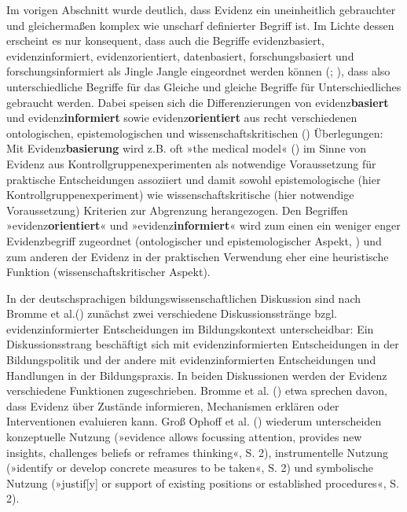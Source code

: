 \documentclass[
  jou,
  floatsintext,
  longtable,
  nolmodern,
  notxfonts,
  notimes,
  colorlinks=true,linkcolor=blue,citecolor=blue,urlcolor=blue]{apa7}
\begin{document}
Im vorigen Abschnitt wurde deutlich, dass Evidenz ein uneinheitlich
gebrauchter und gleichermaßen komplex wie unscharf definierter Begriff
ist. Im Lichte dessen erscheint es nur konsequent, dass auch die
Begriffe evidenzbasiert, evidenzinformiert, evidenzorientiert,
datenbasiert, forschungsbasiert und forschungsinformiert als Jingle
Jangle eingeordnet werden können (; ), dass also
unterschiedliche Begriffe für das Gleiche und gleiche Begriffe für
Unterschiedliches gebraucht werden. Dabei speisen sich die
Differenzierungen von evidenz\textbf{basiert} und
evidenz\textbf{informiert} sowie evidenz\textbf{orientiert} aus recht
verschiedenen ontologischen, epistemologischen und
wissenschaftskritischen () Überlegungen: Mit Evidenz\textbf{basierung} wird z.B. oft »the
medical model« () im Sinne von
Evidenz aus Kontrollgruppenexperimenten als notwendige Voraussetzung für
praktische Entscheidungen assoziiert und damit sowohl epistemologische
(hier Kontrollgruppenexperiment) wie wissenschaftskritische (hier
notwendige Voraussetzung) Kriterien zur Abgrenzung herangezogen. Den
Begriffen »evidenz\textbf{orientiert}« und »evidenz\textbf{informiert}«
wird zum einen ein weniger enger Evidenzbegriff zugeordnet
(ontologischer und epistemologischer Aspekt,
) und zum anderen der Evidenz in
der praktischen Verwendung eher eine heuristische Funktion
(wissenschaftskritischer Aspekt).

In der deutschsprachigen bildungswissenschaftlichen Diskussion sind nach
Bromme et al.() zunächst zwei
verschiedene Diskussionsstränge bzgl. evidenzinformierter Entscheidungen
im Bildungskontext unterscheidbar: Ein Diskussionsstrang beschäftigt
sich mit evidenzinformierten Entscheidungen in der Bildungspolitik und
der andere mit evidenzinformierten Entscheidungen und Handlungen in der
Bildungspraxis. In beiden Diskussionen werden der Evidenz verschiedene
Funktionen zugeschrieben. Bromme et al.
() etwa sprechen davon, dass Evidenz
über Zustände informieren, Mechanismen erklären oder Interventionen
evaluieren kann. Groß Ophoff et al.
() wiederum unterscheiden
konzeptuelle Nutzung (»evidence allows focussing attention, provides new
insights, challenges beliefs or reframes thinking«, S. 2),
instrumentelle Nutzung (»identify or develop concrete measures to be
taken«, S. 2) und symbolische Nutzung (»justif{[}y{]} or support of
existing positions or established procedures«, S. 2).
\end{document}
